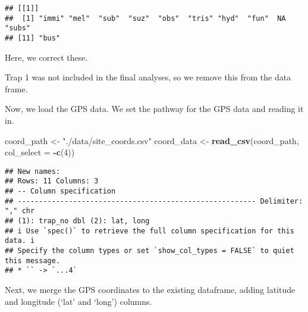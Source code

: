 \documentclass[
]{article}
\newenvironment{Shaded}{\begin{snugshade}}{\end{snugshade}}
\newcommand{\AttributeTok}[1]{\textcolor[rgb]{0.13,0.29,0.53}{#1}}
\newcommand{\DecValTok}[1]{\textcolor[rgb]{0.00,0.00,0.81}{#1}}
\newcommand{\FunctionTok}[1]{\textcolor[rgb]{0.13,0.29,0.53}{\textbf{#1}}}
\newcommand{\NormalTok}[1]{#1}
\newcommand{\OtherTok}[1]{\textcolor[rgb]{0.56,0.35,0.01}{#1}}
\newcommand{\SpecialCharTok}[1]{\textcolor[rgb]{0.81,0.36,0.00}{\textbf{#1}}}
\newcommand{\StringTok}[1]{\textcolor[rgb]{0.31,0.60,0.02}{#1}}
\begin{document}
\begin{verbatim}
## [[1]]
##  [1] "immi" "mel"  "sub"  "suz"  "obs"  "tris" "hyd"  "fun"  NA     "subs"
## [11] "bus"
\end{verbatim}

Here, we correct these.

\begin{Shaded}
\end{Shaded}

Trap 1 was not included in the final analyses, so we remove this from
the data frame.

\begin{Shaded}
\end{Shaded}

Now, we load the GPS data. We set the pathway for the GPS data and
reading it in.

\begin{Shaded}
\begin{Highlighting}[]
\NormalTok{coord\_path }\OtherTok{\textless{}{-}} \StringTok{"./data/site\_coords.csv"}
\NormalTok{coord\_data }\OtherTok{\textless{}{-}} \FunctionTok{read\_csv}\NormalTok{(coord\_path, }\AttributeTok{col\_select =} \SpecialCharTok{{-}}\FunctionTok{c}\NormalTok{(}\DecValTok{4}\NormalTok{))}
\end{Highlighting}
\end{Shaded}

\begin{verbatim}
## New names:
## Rows: 11 Columns: 3
## -- Column specification
## -------------------------------------------------------- Delimiter: "," chr
## (1): trap_no dbl (2): lat, long
## i Use `spec()` to retrieve the full column specification for this data. i
## Specify the column types or set `show_col_types = FALSE` to quiet this message.
## * `` -> `...4`
\end{verbatim}

Next, we merge the GPS coordinates to the existing dataframe, adding
latitude and longitude (`lat' and `long') columns.
\end{document}
